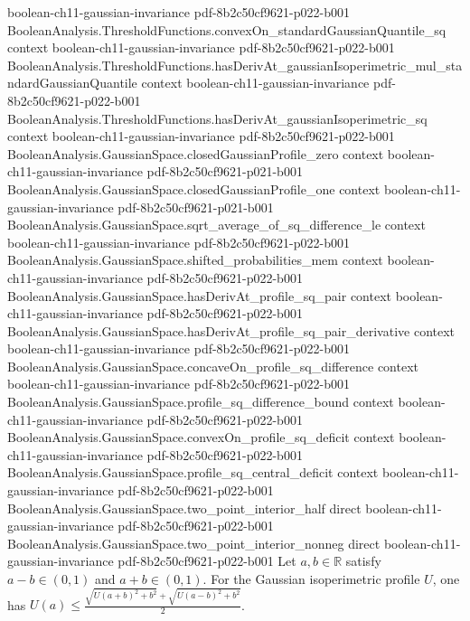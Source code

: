 \begin{lemma}
  {boolean-ch11-gaussian-invariance}
  {pdf-8b2c50cf9621-p022-b001}
\proofstep
  {BooleanAnalysis.ThresholdFunctions.convexOn_standardGaussianQuantile_sq}
  {context}
  {boolean-ch11-gaussian-invariance}
  {pdf-8b2c50cf9621-p022-b001}
\proofstep
  {BooleanAnalysis.ThresholdFunctions.hasDerivAt_gaussianIsoperimetric_mul_standardGaussianQuantile}
  {context}
  {boolean-ch11-gaussian-invariance}
  {pdf-8b2c50cf9621-p022-b001}
\proofstep
  {BooleanAnalysis.ThresholdFunctions.hasDerivAt_gaussianIsoperimetric_sq}
  {context}
  {boolean-ch11-gaussian-invariance}
  {pdf-8b2c50cf9621-p022-b001}
\proofstep
  {BooleanAnalysis.GaussianSpace.closedGaussianProfile_zero}
  {context}
  {boolean-ch11-gaussian-invariance}
  {pdf-8b2c50cf9621-p021-b001}
\proofstep
  {BooleanAnalysis.GaussianSpace.closedGaussianProfile_one}
  {context}
  {boolean-ch11-gaussian-invariance}
  {pdf-8b2c50cf9621-p021-b001}
\proofstep
  {BooleanAnalysis.GaussianSpace.sqrt_average_of_sq_difference_le}
  {context}
  {boolean-ch11-gaussian-invariance}
  {pdf-8b2c50cf9621-p022-b001}
\proofstep
  {BooleanAnalysis.GaussianSpace.shifted_probabilities_mem}
  {context}
  {boolean-ch11-gaussian-invariance}
  {pdf-8b2c50cf9621-p022-b001}
\proofstep
  {BooleanAnalysis.GaussianSpace.hasDerivAt_profile_sq_pair}
  {context}
  {boolean-ch11-gaussian-invariance}
  {pdf-8b2c50cf9621-p022-b001}
\proofstep
  {BooleanAnalysis.GaussianSpace.hasDerivAt_profile_sq_pair_derivative}
  {context}
  {boolean-ch11-gaussian-invariance}
  {pdf-8b2c50cf9621-p022-b001}
\proofstep
  {BooleanAnalysis.GaussianSpace.concaveOn_profile_sq_difference}
  {context}
  {boolean-ch11-gaussian-invariance}
  {pdf-8b2c50cf9621-p022-b001}
\proofstep
  {BooleanAnalysis.GaussianSpace.profile_sq_difference_bound}
  {context}
  {boolean-ch11-gaussian-invariance}
  {pdf-8b2c50cf9621-p022-b001}
\proofstep
  {BooleanAnalysis.GaussianSpace.convexOn_profile_sq_deficit}
  {context}
  {boolean-ch11-gaussian-invariance}
  {pdf-8b2c50cf9621-p022-b001}
\proofstep
  {BooleanAnalysis.GaussianSpace.profile_sq_central_deficit}
  {context}
  {boolean-ch11-gaussian-invariance}
  {pdf-8b2c50cf9621-p022-b001}
\proofstep
  {BooleanAnalysis.GaussianSpace.two_point_interior_half}
  {direct}
  {boolean-ch11-gaussian-invariance}
  {pdf-8b2c50cf9621-p022-b001}
\proofstep
  {BooleanAnalysis.GaussianSpace.two_point_interior_nonneg}
  {direct}
  {boolean-ch11-gaussian-invariance}
  {pdf-8b2c50cf9621-p022-b001}
Let $a,b\in\mathbb R$ satisfy $a-b\in(0,1)$ and $a+b\in(0,1)$. For the Gaussian
isoperimetric profile $U$, one has
$U(a)\le\frac{\sqrt{U(a+b)^2+b^2}+\sqrt{U(a-b)^2+b^2}}{2}$.
\end{lemma}

